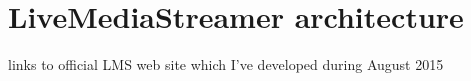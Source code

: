 \chapter{LiveMediaStreamer architecture}\label{ANX:lmsarchfull}

links to official LMS web site which I've developed during August 2015

